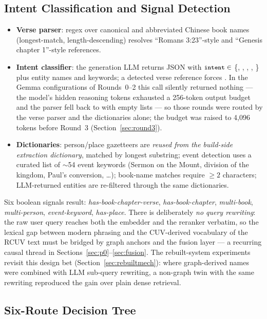 \subsection{Intent Classification and Signal Detection}
\label{sec:signals}

\begin{itemize}
\item \textbf{Verse parser}: regex over canonical and abbreviated
Chinese book names (longest-match, length-descending) resolves
``Romans 3:23''-style and ``Genesis chapter 1''-style references.
\item \textbf{Intent classifier}: the generation LLM returns JSON with
$\texttt{\small intent} \in$ \{, , ,
, \} plus entity names and keywords;
a detected verse reference forces . In the Gemma
configurations of Rounds~0--2 this call silently returned nothing ---
the model's hidden reasoning tokens exhausted a 256-token output budget
and the parser fell back to  with empty lists --- so those
rounds were routed by the verse parser and the dictionaries alone; the
budget was raised to 4{,}096 tokens before Round~3
(Section~\ref{sec:round3}).
\item \textbf{Dictionaries}: person/place gazetteers are \emph{reused
from the build-side extraction dictionary}, matched by longest substring;
event detection uses a curated list of $\sim$54 event keywords (Sermon on
the Mount, division of the kingdom, Paul's conversion, \ldots); book-name
matches require $\ge 2$ characters; LLM-returned entities are re-filtered
through the same dictionaries.
\end{itemize}

Six boolean signals result: \emph{has-book-chapter-verse},
\emph{has-book-chapter}, \emph{multi-book}, \emph{multi-person},
\emph{event-keyword}, \emph{has-place}. There is deliberately \emph{no
query rewriting}: the raw user query reaches both the embedder and the
reranker verbatim, so the lexical gap between modern phrasing and the
CUV-derived vocabulary of the RCUV text must be bridged by graph anchors
and the fusion layer --- a recurring causal thread in
Sections~\ref{sec:p0}--\ref{sec:fusion}. The rebuilt-system experiments
revisit this design bet (Section~\ref{sec:rebuiltmech}): where
graph-derived names were combined with LLM sub-query rewriting, a
non-graph twin with the same rewriting reproduced the gain over plain
dense retrieval.

\subsection{Six-Route Decision Tree}
\label{sec:routes}

